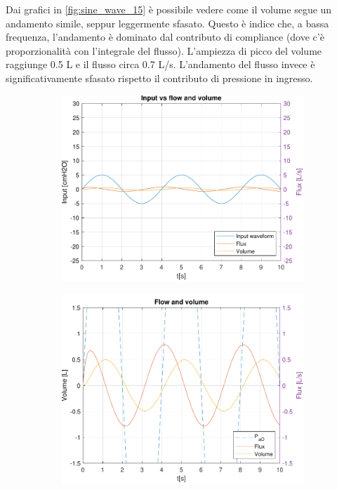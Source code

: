 Dai grafici in \cref{fig:sine_wave_15} è possibile vedere come il volume segue un andamento simile, seppur leggermente sfasato. Questo è indice che, a bassa frequenza, l'andamento è dominato dal contributo di compliance (dove c'è proporzionalità con l'integrale del flusso). L'ampiezza di picco del volume raggiunge 0.5 L e il flusso circa 0.7 L/s. L'andamento del flusso invece è significativamente sfasato rispetto il contributo di pressione in ingresso. 

\begin{figure}[t!]
\begin{subfigure}{0.5\linewidth}
	\centering
	\includegraphics[width=0.95\linewidth]{../model/data_log/data_sine_wave_freq_15.pdf}
	\caption{}
\end{subfigure}\hfill
\begin{subfigure}{0.5\linewidth}
	\centering
	\includegraphics[width=0.95\linewidth]{../model/data_log/data_sine_wave_freq_15_zoom.pdf}

\end{subfigure}
\end{figure}
